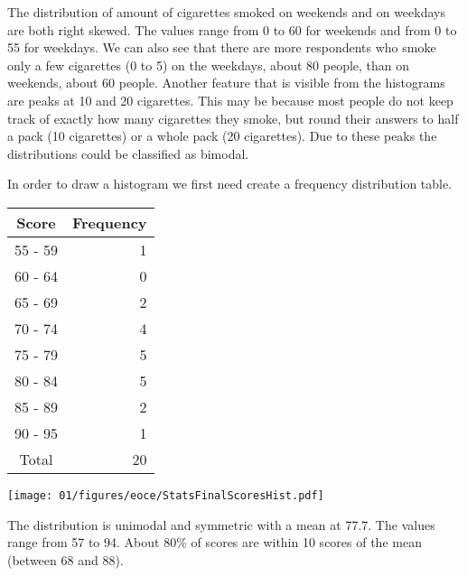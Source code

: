 %

{The distribution of amount of cigarettes smoked on weekends and on weekdays are both right skewed. The values range from 0 to 60 for weekends and from 0 to 55 for weekdays. We can also see that there are more respondents who smoke only a few cigarettes (0 to 5) on the weekdays, about 80 people, than on weekends, about 60 people. Another feature that is visible from the histograms are peaks at 10 and 20 cigarettes. This may be because most people do not keep track of exactly how many cigarettes they smoke, but round their answers to half a pack (10 cigarettes) or a whole pack (20 cigarettes). Due to these peaks the distributions could be classified as bimodal.}

%

{
In order to draw a histogram we first need create a frequency distribution table.
\begin{center}
\begin{minipage}[c]{0.4\textwidth}
\begin{tabular}{cr}
Score & Frequency \\
\hline
55 - 59	& 1 \\
60 - 64	& 0 \\
65 - 69	& 2 \\
70 - 74	& 4 \\
75 - 79	& 5 \\
80 - 84	& 5 \\
85 - 89	& 2 \\
90 - 95	& 1 \\
\hline
Total & 20
\end{tabular}
  \end{minipage}
\begin{minipage}[c]{0.4\textwidth}
\texttt{[image: 01/figures/eoce/StatsFinalScoresHist.pdf]} 
\end{minipage}
\end{center}
The distribution is unimodal and symmetric with a mean at 77.7. The values range from 57 to 94. About 80\% of scores are within 10 scores of the mean (between 68 and 88).
}\label{introStatsFinalScores}

